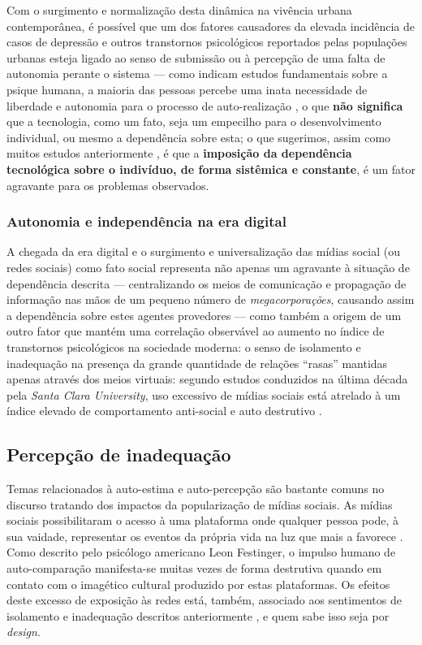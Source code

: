 Com o surgimento e normalização desta dinâmica na vivência urbana contemporânea, é possível que um dos fatores
causadores da elevada incidência de casos de depressão e outros transtornos psicológicos reportados pelas populações
urbanas esteja ligado ao senso de submissão ou à percepção de uma falta de autonomia perante o sistema --- como indicam
estudos fundamentais sobre a psique humana, a maioria das pessoas percebe uma inata necessidade de liberdade e autonomia
para o processo de auto-realização \cite{nietzsche2011will}, o que \textbf{não significa} que a tecnologia, como um
fato, seja um empecilho para o desenvolvimento individual, ou mesmo a dependência sobre esta; o que sugerimos, assim
como muitos estudos anteriormente \cite{kaczynski1995, secretariat1977}, é que a \textbf{imposição da dependência 
tecnológica sobre o indivíduo, de forma sistêmica e constante}, é um fator agravante para os problemas observados.

\subsubsection{Autonomia e independência na era digital}

A chegada da era digital e o surgimento e universalização das mídias social (ou redes sociais) como fato social
representa não apenas um agravante à situação de dependência descrita --- centralizando os meios de comunicação e
propagação de informação nas mãos de um pequeno número de \textit{megacorporações}, causando assim a dependência sobre
estes agentes provedores --- como também a origem de um outro fator que mantém uma correlação observável ao aumento no
índice de transtornos psicológicos na sociedade moderna: o senso de isolamento e inadequação na presença da grande quantidade
de relações ``rasas'' mantidas apenas através dos meios virtuais: segundo estudos conduzidos na última década pela
\textit{Santa Clara University}, uso excessivo de mídias sociais está atrelado à um índice elevado de comportamento
anti-social e auto destrutivo \cite[1]{amediejacob2015}.

\subsection{Percepção de inadequação}

Temas relacionados à auto-estima e auto-percepção são bastante comuns no discurso tratando dos impactos da popularização
de mídias sociais. As mídias sociais possibilitaram o acesso à uma plataforma onde qualquer pessoa pode, à sua
vaidade, representar os eventos da própria vida na luz que mais a favorece \cite{affiziedoes}.
Como descrito pelo psicólogo americano Leon Festinger, o impulso humano de auto-comparação
\cite{festinger1957social} manifesta-se muitas vezes de forma destrutiva quando em contato com o imagético cultural
produzido por estas plataformas. Os efeitos deste excesso de exposição às redes está, também, associado aos sentimentos
de isolamento e inadequação descritos anteriormente \cite[1]{amediejacob2015}, e quem sabe isso seja por
\textit{design}.

